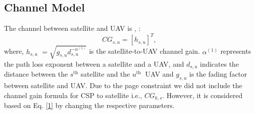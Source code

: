 \documentclass[journal]{IEEEtran}
\begin{document}
\subsection{Channel Model}
The channel between satellite and UAV is \cite{9755995}, \cite{10164260}:  
\begin{equation}
CG_{s, u}= [h_{s,u}]^T,\label{1}
\end{equation} 
where, $h_{s,u}$ $= \sqrt{g_{s,u}{ d_{s, u}^{-\alpha^{(1)}}}}$ is the satellite-to-UAV channel gain. $\alpha^{(1)}$ represents the path loss exponent between a satellite and a UAV, and $d_{s, u}$ indicates the distance between the $s^{\text{th}}$ satellite and the $u^{\text {th }}$ UAV and $g_{s,u}$ is the fading factor between satellite and UAV.  %
Due to the page constraint we did not include the channel gain formula for CSP to satellite i.e., $CG_{k, s}$. However, it is considered based on Eq. \eqref{1} by changing the respective parameters\cite{10297374}.
\end{document}
